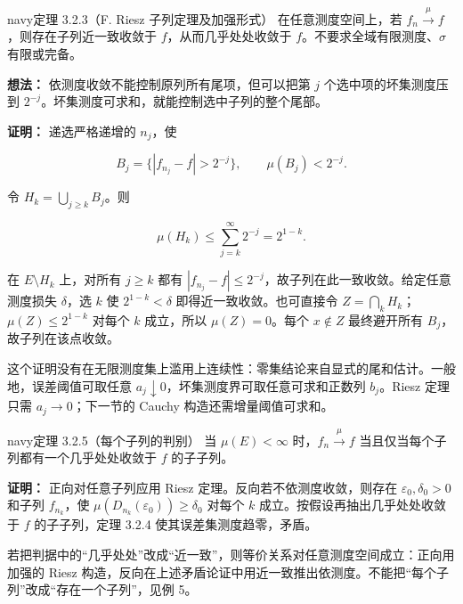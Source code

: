 \documentclass[11pt,a4paper]{article}
\begin{document}
\begin{sboxenv}{navy}{定理 3.2.3（F. Riesz 子列定理及加强形式）}
在任意测度空间上，若 \(f_n\xrightarrow{\mu}f\)，则存在子列近一致收敛于
\(f\)，从而几乎处处收敛于 \(f\)。不要求全域有限测度、\(\sigma\)
有限或完备。

\end{sboxenv}

\textbf{想法：} 依测度收敛不能控制原列所有尾项，但可以把第 \(j\)
个选中项的坏集测度压到
\(2^{-j}\)。坏集测度可求和，就能控制选中子列的整个尾部。

\textbf{证明：} 递选严格递增的 \(n_j\)，使

\begin{equation*}
B_j=\{|f_{n_j}-f|>2^{-j}\},\qquad\mu(B_j)<2^{-j}.
\end{equation*}

令 \(H_k=\bigcup_{j\ge k}B_j\)。则

\begin{equation*}
\mu(H_k)\le\sum_{j=k}^{\infty}2^{-j}=2^{1-k}.
\tag{3.2.4}
\end{equation*}

在 \(E\setminus H_k\) 上，对所有 \(j\ge k\) 都有
\(|f_{n_j}-f|\le2^{-j}\)，故子列在此一致收敛。给定任意测度损失
\(\delta\)，选 \(k\) 使 \(2^{1-k}<\delta\) 即得近一致收敛。也可直接令
\(Z=\bigcap_kH_k\)；\(\mu(Z)\le2^{1-k}\) 对每个 \(k\) 成立，所以
\(\mu(Z)=0\)。每个 \(x\notin Z\) 最终避开所有
\(B_j\)，故子列在该点收敛。

这个证明没有在无限测度集上滥用上连续性：零集结论来自显式的尾和估计。一般地，误差阈值可取任意
\(a_j\downarrow0\)，坏集测度界可取任意可求和正数列 \(b_j\)。Riesz
定理只需 \(a_j\to0\)；下一节的 Cauchy 构造还需增量阈值可求和。

\begin{sboxenv}{navy}{定理 3.2.5（每个子列的判别）}
当 \(\mu(E)<\infty\) 时，\(f_n\xrightarrow{\mu}f\)
当且仅当每个子列都有一个几乎处处收敛于 \(f\) 的子子列。

\end{sboxenv}

\textbf{证明：} 正向对任意子列应用 Riesz
定理。反向若不依测度收敛，则存在 \(\varepsilon_0,\delta_0>0\) 和子列
\(f_{n_k}\)，使 \(\mu(D_{n_k}(\varepsilon_0))\ge\delta_0\) 对每个 \(k\)
成立。按假设再抽出几乎处处收敛于 \(f\) 的子子列，定理 3.2.4
使其误差集测度趋零，矛盾。

若把判据中的``几乎处处''改成``近一致''，则等价关系对任意测度空间成立：正向用加强的
Riesz
构造，反向在上述矛盾论证中用近一致推出依测度。不能把``每个子列''改成``存在一个子列''，见例
5。
\end{document}
